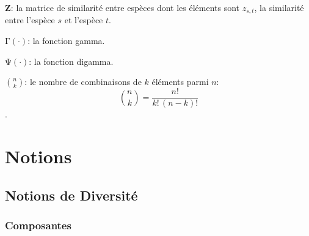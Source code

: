 \documentclass[
  11pt,
  american,
  a4paper,
  extrafontsizes,onecolumn,openright
  ]{memoir}
\begin{document}
\noindent \(\mathbf{Z}\): la matrice de similarité entre espèces dont les éléments sont \(z_{s,t}\), la similarité entre l'espèce \(s\) et l'espèce \(t\).

\noindent \(\mathrm{\Gamma}(\cdot)\): la fonction gamma.

\noindent \(\mathrm{\Psi}(\cdot)\): la fonction digamma.

\noindent \(\binom{n}{k}\): le nombre de combinaisons de \(k\) éléments parmi \(n\): \[\binom{n}{k}=\frac{n!}{k!\,(n-k)!}\].

\mainmatter

\hypertarget{part-notions}{%
\part{Notions}\label{part-notions}}

\hypertarget{chap-Notions}{%
\chapter{Notions de Diversité}\label{chap-Notions}}

\hypertarget{composantes}{%
\section{Composantes}\label{composantes}}



\scriptsize
\end{document}
